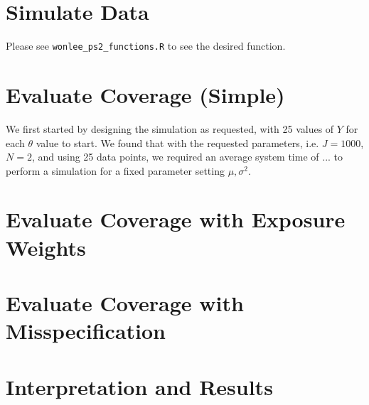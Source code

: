 \documentclass[psamsfonts]{amsart}
\theoremstyle{definition}
\theoremstyle{remark}
\numberwithin{equation}{section}
\begin{document}
\section{Simulate Data}

Please see \texttt{wonlee\_ps2\_functions.R} to see the desired function.

\section{Evaluate Coverage (Simple)}

We first started by designing the simulation as requested, with 25 values of $Y$ for each $\theta$ value to start. We found that with the requested parameters, i.e. $J=1000$, $N=2$, and using 25 data points, we required an average system time of ... to perform a simulation for a fixed parameter setting $\mu, \sigma^2$.

\section{Evaluate Coverage with Exposure Weights}

\section{Evaluate Coverage with Misspecification}

\section{Interpretation and Results}
\end{document}
